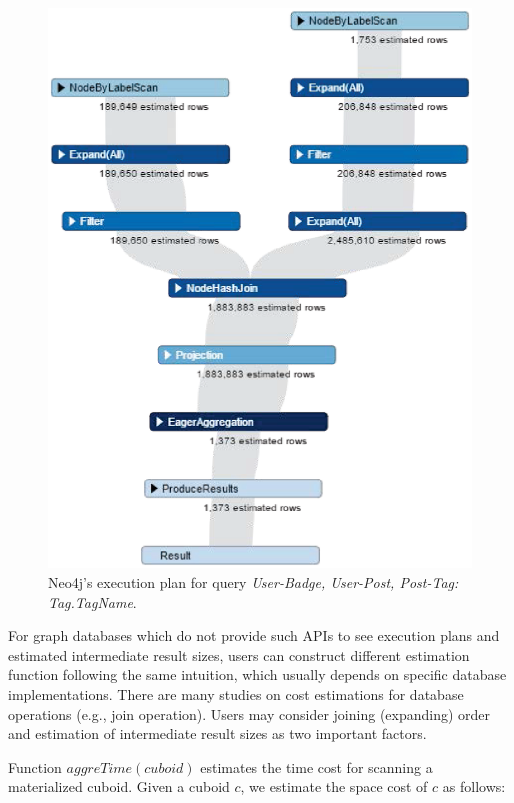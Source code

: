 	\begin {figure}[h]
	\centering
	\includegraphics[scale=0.6]{pic/61.eps}
	\caption{Neo4j's execution plan for query \textit{User-Badge, User-Post, Post-Tag: Tag.TagName}.}
	\label{fig:4:2}
\end{figure}

For graph databases which do not provide such APIs to see execution plans and estimated intermediate result sizes, users can construct different estimation function following the same intuition, which usually depends on specific database implementations. There are many studies on cost estimations for database operations (e.g., join operation). Users may consider joining (expanding) order \cite{DBLP:conf/pods/Chaudhuri98} and estimation of intermediate result sizes  \cite{DBLP:conf/edbt/SwamiS94} as two important factors.

Function \textbf{$aggreTime(cuboid)$} estimates the time cost for scanning a materialized cuboid. Given a cuboid $c$, we estimate the space cost of $c$ as follows:


